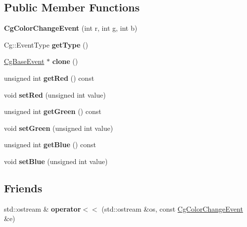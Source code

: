 \subsection*{Public Member Functions}
\begin{DoxyCompactItemize}
\item 
\mbox{\label{class_cg_color_change_event_abac9979b118cf1073e2f1a32f8dc8177}} 
{\bfseries Cg\+Color\+Change\+Event} (int r, int g, int b)
\item 
\mbox{\label{class_cg_color_change_event_a2f9dcfa6aefb6c6dd13b165a72cca2f1}} 
Cg\+::\+Event\+Type {\bfseries get\+Type} ()
\item 
\mbox{\label{class_cg_color_change_event_a5322981070e6cf28807a26f6ec92be30}} 
\hyperlink{class_cg_base_event}{Cg\+Base\+Event} $\ast$ {\bfseries clone} ()
\item 
\mbox{\label{class_cg_color_change_event_aa558fcf95b82fc0f79ae1e9f6a58c497}} 
unsigned int {\bfseries get\+Red} () const
\item 
\mbox{\label{class_cg_color_change_event_a5126cfb411efd3222a874246459b8a72}} 
void {\bfseries set\+Red} (unsigned int value)
\item 
\mbox{\label{class_cg_color_change_event_a2a870569d67fbbc1c32f555211d7e4f0}} 
unsigned int {\bfseries get\+Green} () const
\item 
\mbox{\label{class_cg_color_change_event_af251e210463e29ab629f217593dbc3e1}} 
void {\bfseries set\+Green} (unsigned int value)
\item 
\mbox{\label{class_cg_color_change_event_a0be72116488f80c15bf4631afbaf9b4d}} 
unsigned int {\bfseries get\+Blue} () const
\item 
\mbox{\label{class_cg_color_change_event_a7e785d69911dfed98ac1bd19c00a96d7}} 
void {\bfseries set\+Blue} (unsigned int value)
\end{DoxyCompactItemize}
\subsection*{Friends}
\begin{DoxyCompactItemize}
\item 
\mbox{\label{class_cg_color_change_event_ae7cca3be591dd132b587f5b0bb8c7e49}} 
std\+::ostream \& {\bfseries operator$<$$<$} (std\+::ostream \&os, const \hyperlink{class_cg_color_change_event}{Cg\+Color\+Change\+Event} \&e)
\end{DoxyCompactItemize}


